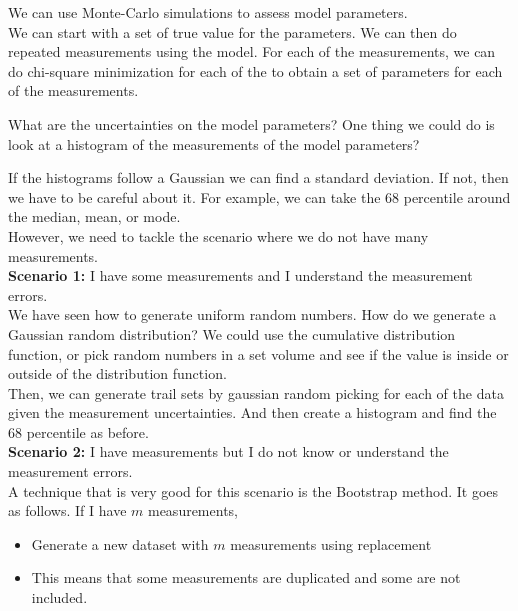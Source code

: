 \documentclass[]{article}
\begin{document}
We can use Monte-Carlo simulations to assess model parameters.\\

We can start with a set of true value for the parameters. We can then do repeated measurements using the model. For each of the measurements, we can do chi-square minimization for each of the to obtain a set of parameters for each of the measurements. 



What are the uncertainties on the model parameters? One thing we could do is look at a histogram of the measurements of the model parameters?


If the histograms follow a Gaussian we can find a standard deviation. If not, then we have to be careful about it. For example, we can take the 68 percentile around the median, mean, or mode. \\

However, we need to tackle the scenario where we do not have many measurements.\\

\textbf{Scenario 1:} I have some measurements and I understand the measurement errors. \\


We have seen how to generate uniform random numbers. How do we generate a Gaussian random distribution? We could use the cumulative distribution function, or pick random numbers in a set volume and see if the value is inside or outside of the distribution function.\\

Then, we can generate trail sets by gaussian random picking for each of the data given the measurement uncertainties. And then create a histogram and find the 68 percentile as before.\\

\textbf{Scenario 2:} I have measurements but I do not know or understand the measurement errors. \\


A technique that is very good for this scenario is the Bootstrap method. It goes as follows. If I have $m$ measurements,

\begin{itemize}
	\item Generate a new dataset with $m$ measurements using replacement
	\item This means that some measurements are duplicated and some are not included.
\end{itemize}\bigbreak
\end{document}
